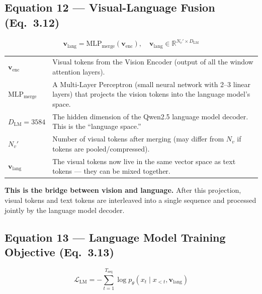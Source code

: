 \documentclass[12pt, a4paper]{article}
\begin{document}
\subsection{Equation 12 --- Visual-Language Fusion (Eq.~3.12)}

\begin{eqbox}
\[
\mathbf{v}_{\text{lang}} = \text{MLP}_{\text{merge}}(\mathbf{v}_{\text{enc}}), \quad \mathbf{v}_{\text{lang}} \in \mathbb{R}^{N_v' \times D_{\text{LM}}}
\]
\end{eqbox}

\begin{explainbox}
\begin{tabular}{lp{11cm}}
$\mathbf{v}_{\text{enc}}$ & Visual tokens from the Vision Encoder (output of all the window attention layers).\\[0.2cm]
$\text{MLP}_{\text{merge}}$ & A Multi-Layer Perceptron (small neural network with 2--3 linear layers) that projects the vision tokens into the language model's space.\\[0.2cm]
$D_{\text{LM}} = 3584$ & The hidden dimension of the Qwen2.5 language model decoder. This is the ``language space.''\\[0.2cm]
$N_v'$ & Number of visual tokens after merging (may differ from $N_v$ if tokens are pooled/compressed).\\[0.2cm]
$\mathbf{v}_{\text{lang}}$ & The visual tokens now live in the same vector space as text tokens --- they can be mixed together.
\end{tabular}

\textbf{This is the bridge between vision and language.} After this projection, visual tokens and text tokens are interleaved into a single sequence and processed jointly by the language model decoder.
\end{explainbox}


\subsection{Equation 13 --- Language Model Training Objective (Eq.~3.13)}

\begin{eqbox}
\[
\mathcal{L}_{\text{LM}} = -\sum_{t=1}^{T_{\text{seq}}} \log p_\theta(x_t \mid x_{<t}, \mathbf{v}_{\text{lang}})
\]
\end{eqbox}
\end{document}
